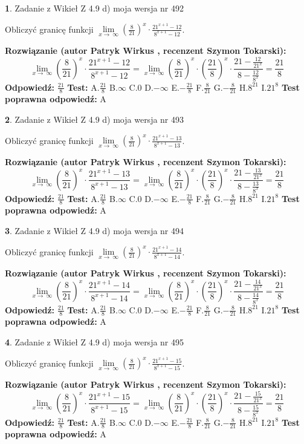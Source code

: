 \documentclass[12pt, a4paper]{article}
\theoremstyle{definition} %
\newtheorem{zad}{}
\newcommand{\zadStart}[1]{\begin{zad}#1\newline}
\newcommand{\zadStop}{\end{zad}}
\newcommand{\rozwStart}[2]{\noindent \textbf{Rozwiązanie (autor #1 , recenzent #2): }\newline}
\newcommand{\rozwStop}{\newline}
\newcommand{\odpStart}{\noindent \textbf{Odpowiedź:}\newline}
\newcommand{\odpStop}{\newline}
\newcommand{\testStart}{\noindent \textbf{Test:}\newline}
\newcommand{\testStop}{\newline}
\newcommand{\kluczStart}{\noindent \textbf{Test poprawna odpowiedź:}\newline}
\newcommand{\kluczStop}{\newline}
\begin{document}
\zadStart{Zadanie z Wikieł Z 4.9 d) moja wersja nr 492}


Obliczyć granicę funkcji  $\lim\limits_{x\to\ \infty}(\frac{8}{21})^{x}\cdot\frac{21^{x+1}-12}{8^{x+1}-12}$.
\zadStop
\rozwStart{Patryk Wirkus}{Szymon Tokarski}
$$\lim\limits_{x\to\ \infty}(\frac{8}{21})^{x}\cdot\frac{21^{x+1}-12}{8^{x+1}-12}=\lim\limits_{x\to\ \infty}(\frac{8}{21})^{x}\cdot(\frac{21}{8})^{x} \cdot \frac{21-\frac{12}{21^{x}}}{8-\frac{12}{8^{x}}} = \frac{21}{8}$$
\rozwStop
\odpStart
$\frac{21}{8}$
\odpStop
\testStart
A.$\frac{21}{8}$ B.$\infty$ C.$0$ D.$-\infty$ E.$-\frac{21}{8}$
F.$\frac{8}{21}$ G.$-\frac{8}{21}$
H.$8^{21}$
I.$21^{8}$
\testStop
\kluczStart
A
\kluczStop



\zadStart{Zadanie z Wikieł Z 4.9 d) moja wersja nr 493}


Obliczyć granicę funkcji  $\lim\limits_{x\to\ \infty}(\frac{8}{21})^{x}\cdot\frac{21^{x+1}-13}{8^{x+1}-13}$.
\zadStop
\rozwStart{Patryk Wirkus}{Szymon Tokarski}
$$\lim\limits_{x\to\ \infty}(\frac{8}{21})^{x}\cdot\frac{21^{x+1}-13}{8^{x+1}-13}=\lim\limits_{x\to\ \infty}(\frac{8}{21})^{x}\cdot(\frac{21}{8})^{x} \cdot \frac{21-\frac{13}{21^{x}}}{8-\frac{13}{8^{x}}} = \frac{21}{8}$$
\rozwStop
\odpStart
$\frac{21}{8}$
\odpStop
\testStart
A.$\frac{21}{8}$ B.$\infty$ C.$0$ D.$-\infty$ E.$-\frac{21}{8}$
F.$\frac{8}{21}$ G.$-\frac{8}{21}$
H.$8^{21}$
I.$21^{8}$
\testStop
\kluczStart
A
\kluczStop



\zadStart{Zadanie z Wikieł Z 4.9 d) moja wersja nr 494}


Obliczyć granicę funkcji  $\lim\limits_{x\to\ \infty}(\frac{8}{21})^{x}\cdot\frac{21^{x+1}-14}{8^{x+1}-14}$.
\zadStop
\rozwStart{Patryk Wirkus}{Szymon Tokarski}
$$\lim\limits_{x\to\ \infty}(\frac{8}{21})^{x}\cdot\frac{21^{x+1}-14}{8^{x+1}-14}=\lim\limits_{x\to\ \infty}(\frac{8}{21})^{x}\cdot(\frac{21}{8})^{x} \cdot \frac{21-\frac{14}{21^{x}}}{8-\frac{14}{8^{x}}} = \frac{21}{8}$$
\rozwStop
\odpStart
$\frac{21}{8}$
\odpStop
\testStart
A.$\frac{21}{8}$ B.$\infty$ C.$0$ D.$-\infty$ E.$-\frac{21}{8}$
F.$\frac{8}{21}$ G.$-\frac{8}{21}$
H.$8^{21}$
I.$21^{8}$
\testStop
\kluczStart
A
\kluczStop



\zadStart{Zadanie z Wikieł Z 4.9 d) moja wersja nr 495}


Obliczyć granicę funkcji  $\lim\limits_{x\to\ \infty}(\frac{8}{21})^{x}\cdot\frac{21^{x+1}-15}{8^{x+1}-15}$.
\zadStop
\rozwStart{Patryk Wirkus}{Szymon Tokarski}
$$\lim\limits_{x\to\ \infty}(\frac{8}{21})^{x}\cdot\frac{21^{x+1}-15}{8^{x+1}-15}=\lim\limits_{x\to\ \infty}(\frac{8}{21})^{x}\cdot(\frac{21}{8})^{x} \cdot \frac{21-\frac{15}{21^{x}}}{8-\frac{15}{8^{x}}} = \frac{21}{8}$$
\rozwStop
\odpStart
$\frac{21}{8}$
\odpStop
\testStart
A.$\frac{21}{8}$ B.$\infty$ C.$0$ D.$-\infty$ E.$-\frac{21}{8}$
F.$\frac{8}{21}$ G.$-\frac{8}{21}$
H.$8^{21}$
I.$21^{8}$
\testStop
\kluczStart
A
\kluczStop
\end{document}
